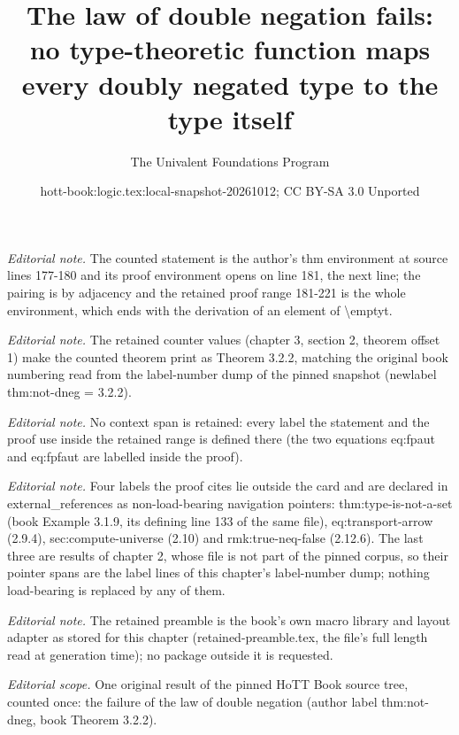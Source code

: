 \documentclass[10pt,a4paper]{article}
\title{The law of double negation fails: no type-theoretic function maps every doubly negated type to the type itself}
\author{The Univalent Foundations Program}
\date{hott-book:logic.tex:local-snapshot-20261012; CC BY-SA 3.0 Unported}
\newcounter{chapter}
\theoremstyle{definition}
\theoremstyle{remark}
\numberwithin{equation}{section}
\begin{document}
\maketitle
\setcounter{chapter}{3}
\setcounter{section}{2}
\setcounter{thm}{1}
\noindent\textit{Editorial note.} The counted statement is the author's thm environment at source lines 177-180 and its proof environment opens on line 181, the next line; the pairing is by adjacency and the retained proof range 181-221 is the whole environment, which ends with the derivation of an element of \textbackslash{}emptyt.\par\medskip
\noindent\textit{Editorial note.} The retained counter values (chapter 3, section 2, theorem offset 1) make the counted theorem print as Theorem 3.2.2, matching the original book numbering read from the label-number dump of the pinned snapshot (newlabel thm:not-dneg = 3.2.2).\par\medskip
\noindent\textit{Editorial note.} No context span is retained: every label the statement and the proof use inside the retained range is defined there (the two equations eq:fpaut and eq:fpfaut are labelled inside the proof).\par\medskip
\noindent\textit{Editorial note.} Four labels the proof cites lie outside the card and are declared in external\_references as non-load-bearing navigation pointers: thm:type-is-not-a-set (book Example 3.1.9, its defining line 133 of the same file), eq:transport-arrow (2.9.4), sec:compute-universe (2.10) and rmk:true-neq-false (2.12.6). The last three are results of chapter 2, whose file is not part of the pinned corpus, so their pointer spans are the label lines of this chapter's label-number dump; nothing load-bearing is replaced by any of them.\par\medskip
\noindent\textit{Editorial note.} The retained preamble is the book's own macro library and layout adapter as stored for this chapter (retained-preamble.tex, the file's full length read at generation time); no package outside it is requested.\par\medskip
\noindent\textit{Editorial scope.} One original result of the pinned HoTT Book source tree, counted once: the failure of the law of double negation (author label thm:not-dneg, book Theorem 3.2.2).\par\medskip
\end{document}
